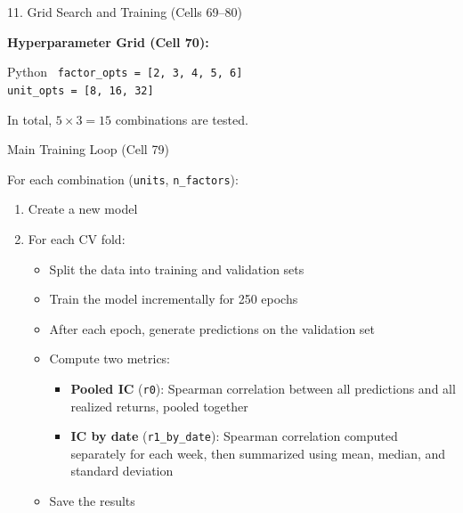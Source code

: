 \documentclass[aspectratio=169, 11pt]{beamer}
\begin{document}
%
%
\begin{frame}{11. Grid Search and Training (Cells 69--80)}

\textbf{Hyperparameter Grid (Cell 70):}

\vspace{0.2cm}

\begin{block}{Python}
\small
\texttt{
factor\_opts = [2, 3, 4, 5, 6] \\
unit\_opts = [8, 16, 32]
}
\end{block}

\vspace{0.3cm}

In total, $5 \times 3 = 15$ combinations are tested.

\end{frame}
%
%
\begin{frame}{Main Training Loop (Cell 79)}

For each combination (\texttt{units}, \texttt{n\_factors}):

\vspace{0.3cm}

\begin{enumerate}
    \item Create a new model
    \item For each CV fold:
    \begin{itemize}
    \normalsize
        \item Split the data into training and validation sets
        \item Train the model incrementally for 250 epochs
        \item After each epoch, generate predictions on the validation set
        \item Compute two metrics:
        \begin{itemize}
        \normalsize
            \item \textbf{Pooled IC} (\texttt{r0}): Spearman correlation between all predictions and all realized returns, pooled together
            \item \textbf{IC by date} (\texttt{r1\_by\_date}): Spearman correlation computed separately for each week, then summarized using mean, median, and standard deviation
        \end{itemize}
        \item Save the results
    \end{itemize}
\end{enumerate}

\end{frame}
\end{document}
